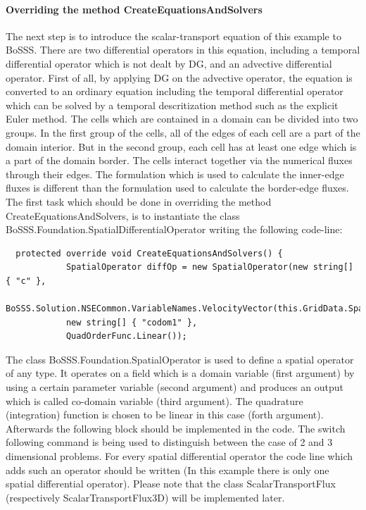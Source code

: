 \documentclass[11pt,twoside,a4paper]{fdyartcl}
\begin{document}
{\paragraph{Overriding the method {\scriptsize CreateEquationsAndSolvers}}
The next step is to introduce the scalar-transport equation of this example to BoSSS. There are two differential operators in this equation, including a temporal differential operator which is not dealt by DG, and an advective differential operator. First of all, by applying DG on the advective operator, the equation is converted to an ordinary equation including the temporal differential operator which can be solved by a temporal descritization method such as the explicit Euler method. The cells which are contained in a domain can be divided into two groups. In the first group of the cells, all of the edges of each cell are a part of the domain interior. But in the second group, each cell has at least one edge which is a part of the domain border. The cells interact together via the numerical fluxes through their edges. The formulation which is used to calculate the inner-edge fluxes is different than the formulation used to calculate the border-edge fluxes. The first task which should be done in overriding the method {\scriptsize CreateEquationsAndSolvers}, is to instantiate the class {\scriptsize BoSSS.Foundation.SpatialDifferentialOperator} writing the following code-line:
{\scriptsize \begin{verbatim}
  protected override void CreateEquationsAndSolvers() {
            SpatialOperator diffOp = new SpatialOperator(new string[] { "c" },
            BoSSS.Solution.NSECommon.VariableNames.VelocityVector(this.GridData.SpatialDimension),
            new string[] { "codom1" },
            QuadOrderFunc.Linear());
\end{verbatim}}
The class {\scriptsize BoSSS.Foundation.SpatialOperator} is used to define a spatial operator of any type. It operates on a field which is a domain variable (first argument) by using a certain parameter variable (second argument) and produces an output which is called co-domain variable (third argument). The quadrature (integration) function is chosen to be linear in this case (forth argument). Afterwards the following block should be implemented in the code. The switch following command is being used to distinguish between the case of 2 and 3 dimensional problems. For every spatial differential operator the code line which adds such an operator should be written (In this example there is only one spatial differential operator). Please note that the class {\scriptsize ScalarTransportFlux} (respectively {\scriptsize ScalarTransportFlux3D}) will be implemented later. 
}
\end{document}
